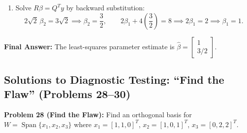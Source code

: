 \documentclass[11pt, letterpaper]{article}
\theoremstyle{definition}
\theoremstyle{remark}
\begin{document}
\begin{enumerate}[label=\textbf{Step \arabic*:}]
    \[
        Q^T y = \begin{bmatrix}
            1/2 & 1/2 & 1/2 & 1/2 \\
            0 & 1/\sqrt{2} & -1/\sqrt{2} & 0
        \end{bmatrix} \begin{bmatrix} 3 \\ 7 \\ 1 \\ 5 \end{bmatrix}
        = \begin{bmatrix} 8 \\ 6/\sqrt{2} \end{bmatrix} = \begin{bmatrix} 8 \\ 3\sqrt{2} \end{bmatrix}.
    \]
    \item Solve $R\beta = Q^T y$ by backward substitution:
    \[
        2\sqrt{2}\,\beta_2 = 3\sqrt{2} \implies \beta_2 = \frac{3}{2}, \qquad 2\beta_1 + 4\left(\frac{3}{2}\right) = 8 \implies 2\beta_1 = 2 \implies \beta_1 = 1.
    \]
\end{enumerate}
\textbf{Final Answer:} The least-squares parameter estimate is $\hat{\beta} = \begin{bmatrix} 1 \\ 3/2 \end{bmatrix}$.

\subsection{Solutions to Diagnostic Testing: ``Find the Flaw'' (Problems 28--30)}

\textbf{Problem 28 (Find the Flaw):} Find an orthogonal basis for $W = \operatorname{Span}\{x_1, x_2, x_3\}$ where $x_1 = [1, 1, 0]^T$, $x_2 = [1, 0, 1]^T$, $x_3 = [0, 2, 2]^T$.
\end{document}
